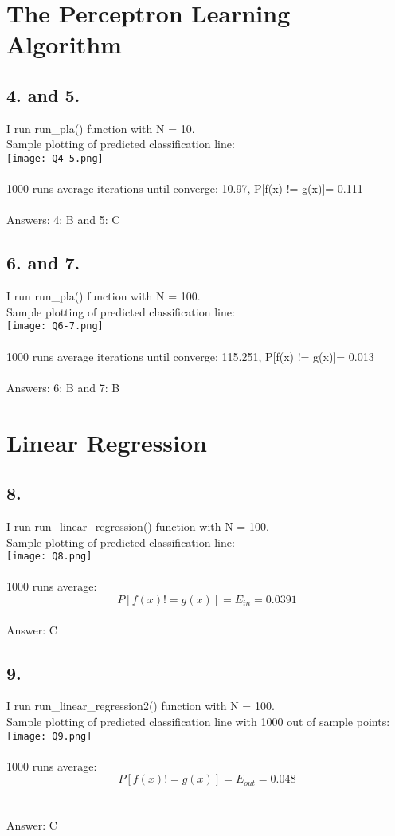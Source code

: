 \documentclass{homework}
\begin{document}
\section*{The Perceptron Learning Algorithm}
\subsection*{4. and 5.}
I run run_pla() function with N = 10.\\
Sample plotting of predicted classification line:\\
\texttt{[image: Q4-5.png]} \\\\
1000 runs average iterations until converge: 10.97, P[f(x) != g(x)]= 0.111\\\\
Answers: 4: B and 5: C

\subsection*{6. and 7.}
I run run_pla() function with N = 100.\\
Sample plotting of predicted classification line:\\
\texttt{[image: Q6-7.png]} \\\\
1000 runs average iterations until converge: 115.251, P[f(x) != g(x)]= 0.013\\\\
Answers: 6: B and 7: B

\section*{Linear Regression}
\subsection*{8.}
I run run_linear_regression() function with N = 100.\\
Sample plotting of predicted classification line:\\
\texttt{[image: Q8.png]} \\\\
1000 runs average:\\
\[P[f(x) != g(x)] = E_{in}=  0.0391\]\\
Answer: C

\subsection*{9.}
I run run_linear_regression2() function with N = 100.\\
Sample plotting of predicted classification line with 1000 out of sample points:\\
\texttt{[image: Q9.png]} \\\\
1000 runs average:\\
\[P[f(x) != g(x)] = E_{out}=  0.048\]\\\\
Answer: C
\end{document}
